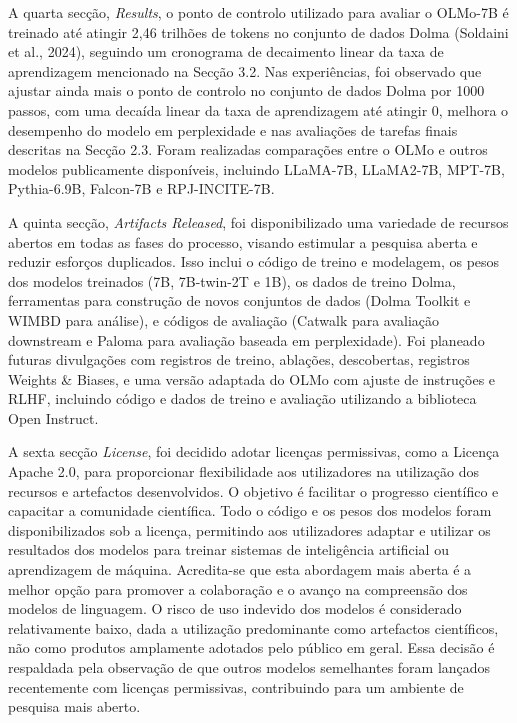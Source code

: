 \documentclass{article}
\begin{document}
\newpage

A quarta secção, \textit{Results}, 
o ponto de controlo utilizado para avaliar o OLMo-7B é treinado até atingir 2,46 trilhões de tokens no conjunto de dados Dolma (Soldaini et al., 2024), seguindo um cronograma de decaimento linear da taxa de aprendizagem mencionado na Secção 3.2. Nas experiências, foi observado que ajustar ainda mais o ponto de controlo no conjunto de dados Dolma por 1000 passos, com uma decaída linear da taxa de aprendizagem até atingir 0, melhora o desempenho do modelo em perplexidade e nas avaliações de tarefas finais descritas na Secção 2.3. Foram realizadas comparações entre o OLMo e outros modelos publicamente disponíveis, incluindo LLaMA-7B, LLaMA2-7B, MPT-7B, Pythia-6.9B, Falcon-7B e RPJ-INCITE-7B.

\vspace{3mm}

A quinta secção, \textit{Artifacts Released}, foi disponibilizado uma variedade de recursos abertos em todas as fases do processo, visando estimular a pesquisa aberta e reduzir esforços duplicados. Isso inclui o código de treino e modelagem, os pesos dos modelos treinados (7B, 7B-twin-2T e 1B), os dados de treino Dolma, ferramentas para construção de novos conjuntos de dados (Dolma Toolkit e WIMBD para análise), e códigos de avaliação (Catwalk para avaliação downstream e Paloma para avaliação baseada em perplexidade). Foi planeado futuras divulgações com registros de treino, ablações, descobertas, registros Weights & Biases, e uma versão adaptada do OLMo com ajuste de instruções e RLHF, incluindo código e dados de treino e avaliação utilizando a biblioteca Open Instruct.

\vspace{3mm}

A sexta secção \textit{License}, foi decidido adotar licenças permissivas, como a Licença Apache 2.0, para proporcionar flexibilidade aos utilizadores na utilização dos recursos e artefactos desenvolvidos. O objetivo é facilitar o progresso científico e capacitar a comunidade científica. Todo o código e os pesos dos modelos foram disponibilizados sob a licença, permitindo aos utilizadores adaptar e utilizar os resultados dos modelos para treinar sistemas de inteligência artificial ou aprendizagem de máquina. Acredita-se que esta abordagem mais aberta é a melhor opção para promover a colaboração e o avanço na compreensão dos modelos de linguagem. O risco de uso indevido dos modelos é considerado relativamente baixo, dada a utilização predominante como artefactos científicos, não como produtos amplamente adotados pelo público em geral. Essa decisão é respaldada pela observação de que outros modelos semelhantes foram lançados recentemente com licenças permissivas, contribuindo para um ambiente de pesquisa mais aberto.
\end{document}
